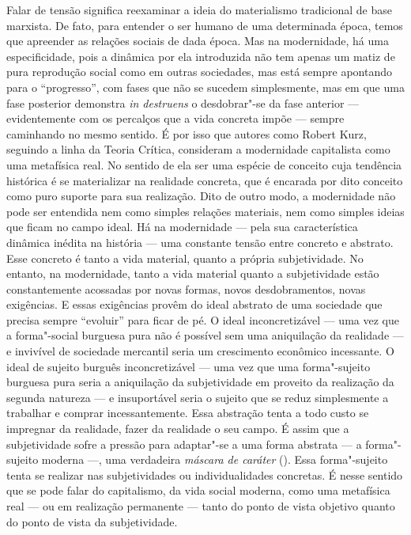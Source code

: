 Falar de tensão significa reexaminar a ideia do materialismo tradicional
de base marxista. De fato, para entender o ser humano de uma determinada
época, temos que apreender as relações sociais de dada época. Mas na
modernidade, há uma especificidade, pois a dinâmica por ela introduzida
não tem apenas um matiz de pura reprodução social como em outras
sociedades, mas está sempre apontando para o ``progresso'', com fases
que não se sucedem simplesmente, mas em que uma fase posterior demonstra
\emph{in destruens} o desdobrar"-se da fase anterior --- evidentemente com
os percalços que a vida concreta impõe --- sempre caminhando no mesmo
sentido. É por isso que autores como Robert Kurz, seguindo a linha da
Teoria Crítica, consideram a modernidade capitalista como uma metafísica
real. No sentido de ela ser uma espécie de conceito cuja tendência
histórica é se materializar na realidade concreta, que é encarada por
dito conceito como puro suporte para sua realização. Dito de outro modo,
a modernidade não pode ser entendida nem como simples relações
materiais, nem como simples ideias que ficam no campo ideal. Há na
modernidade --- pela sua característica dinâmica inédita na história ---
uma constante tensão entre concreto e abstrato. Esse concreto é tanto a
vida material, quanto a própria subjetividade. No entanto, na
modernidade, tanto a vida material quanto a subjetividade estão
constantemente acossadas por novas formas, novos desdobramentos, novas
exigências. E essas exigências provêm do ideal abstrato de uma sociedade
que precisa sempre ``evoluir'' para ficar de pé. O ideal inconcretizável
--- uma vez que a forma"-social burguesa pura não é possível sem uma
aniquilação da realidade --- e invivível de sociedade mercantil seria um
crescimento econômico incessante. O ideal de sujeito burguês
inconcretizável --- uma vez que uma forma"-sujeito burguesa pura seria a
aniquilação da subjetividade em proveito da realização da segunda
natureza --- e insuportável seria o sujeito que se reduz simplesmente a
trabalhar e comprar incessantemente. Essa abstração tenta a todo custo
se impregnar da realidade, fazer da realidade o seu campo. É assim que a
subjetividade sofre a pressão para adaptar"-se a uma forma abstrata --- a
forma"-sujeito moderna ---, uma verdadeira \emph{máscara de caráter}
(). Essa forma"-sujeito tenta se realizar nas subjetividades ou
individualidades concretas. É nesse sentido que se pode falar do
capitalismo, da vida social moderna, como uma metafísica real --- ou em
realização permanente --- tanto do ponto de vista objetivo quanto do
ponto de vista da subjetividade.

